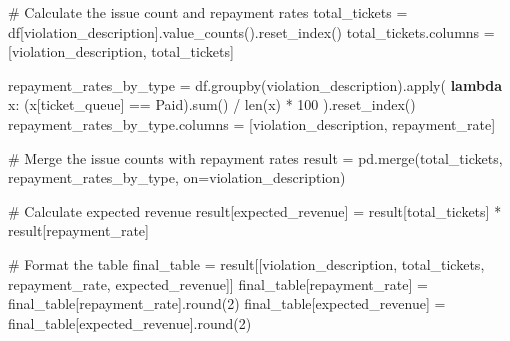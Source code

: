 \documentclass[
  letterpaper,
  DIV=11,
  numbers=noendperiod]{scrartcl}
\newenvironment{Shaded}{\begin{snugshade}}{\end{snugshade}}
\newcommand{\BuiltInTok}[1]{\textcolor[rgb]{0.00,0.23,0.31}{#1}}
\newcommand{\CommentTok}[1]{\textcolor[rgb]{0.37,0.37,0.37}{#1}}
\newcommand{\DecValTok}[1]{\textcolor[rgb]{0.68,0.00,0.00}{#1}}
\newcommand{\KeywordTok}[1]{\textcolor[rgb]{0.00,0.23,0.31}{\textbf{#1}}}
\newcommand{\NormalTok}[1]{\textcolor[rgb]{0.00,0.23,0.31}{#1}}
\newcommand{\OperatorTok}[1]{\textcolor[rgb]{0.37,0.37,0.37}{#1}}
\newcommand{\StringTok}[1]{\textcolor[rgb]{0.13,0.47,0.30}{#1}}
\begin{document}
\begin{Shaded}
\begin{Highlighting}[]
\CommentTok{\# Calculate the issue count and repayment rates}
\NormalTok{total\_tickets }\OperatorTok{=}\NormalTok{ df[}\StringTok{\textquotesingle{}violation\_description\textquotesingle{}}\NormalTok{].value\_counts().reset\_index()}
\NormalTok{total\_tickets.columns }\OperatorTok{=}\NormalTok{ [}\StringTok{\textquotesingle{}violation\_description\textquotesingle{}}\NormalTok{, }\StringTok{\textquotesingle{}total\_tickets\textquotesingle{}}\NormalTok{]}

\NormalTok{repayment\_rates\_by\_type }\OperatorTok{=}\NormalTok{ df.groupby(}\StringTok{\textquotesingle{}violation\_description\textquotesingle{}}\NormalTok{).}\BuiltInTok{apply}\NormalTok{(}
    \KeywordTok{lambda}\NormalTok{ x: (x[}\StringTok{\textquotesingle{}ticket\_queue\textquotesingle{}}\NormalTok{] }\OperatorTok{==} \StringTok{\textquotesingle{}Paid\textquotesingle{}}\NormalTok{).}\BuiltInTok{sum}\NormalTok{() }\OperatorTok{/} \BuiltInTok{len}\NormalTok{(x) }\OperatorTok{*} \DecValTok{100}
\NormalTok{).reset\_index()}
\NormalTok{repayment\_rates\_by\_type.columns }\OperatorTok{=}\NormalTok{ [}\StringTok{\textquotesingle{}violation\_description\textquotesingle{}}\NormalTok{, }\StringTok{\textquotesingle{}repayment\_rate\textquotesingle{}}\NormalTok{]}

\CommentTok{\# Merge the issue counts with repayment rates}
\NormalTok{result }\OperatorTok{=}\NormalTok{ pd.merge(total\_tickets, repayment\_rates\_by\_type, on}\OperatorTok{=}\StringTok{\textquotesingle{}violation\_description\textquotesingle{}}\NormalTok{)}

\CommentTok{\# Calculate expected revenue}
\NormalTok{result[}\StringTok{\textquotesingle{}expected\_revenue\textquotesingle{}}\NormalTok{] }\OperatorTok{=}\NormalTok{ result[}\StringTok{\textquotesingle{}total\_tickets\textquotesingle{}}\NormalTok{] }\OperatorTok{*}\NormalTok{ result[}\StringTok{\textquotesingle{}repayment\_rate\textquotesingle{}}\NormalTok{]}

\CommentTok{\# Format the table}
\NormalTok{final\_table }\OperatorTok{=}\NormalTok{ result[[}\StringTok{\textquotesingle{}violation\_description\textquotesingle{}}\NormalTok{, }\StringTok{\textquotesingle{}total\_tickets\textquotesingle{}}\NormalTok{, }\StringTok{\textquotesingle{}repayment\_rate\textquotesingle{}}\NormalTok{, }\StringTok{\textquotesingle{}expected\_revenue\textquotesingle{}}\NormalTok{]]}
\NormalTok{final\_table[}\StringTok{\textquotesingle{}repayment\_rate\textquotesingle{}}\NormalTok{] }\OperatorTok{=}\NormalTok{ final\_table[}\StringTok{\textquotesingle{}repayment\_rate\textquotesingle{}}\NormalTok{].}\BuiltInTok{round}\NormalTok{(}\DecValTok{2}\NormalTok{)}
\NormalTok{final\_table[}\StringTok{\textquotesingle{}expected\_revenue\textquotesingle{}}\NormalTok{] }\OperatorTok{=}\NormalTok{ final\_table[}\StringTok{\textquotesingle{}expected\_revenue\textquotesingle{}}\NormalTok{].}\BuiltInTok{round}\NormalTok{(}\DecValTok{2}\NormalTok{)}


\end{Highlighting}
\end{Shaded}
\end{document}
